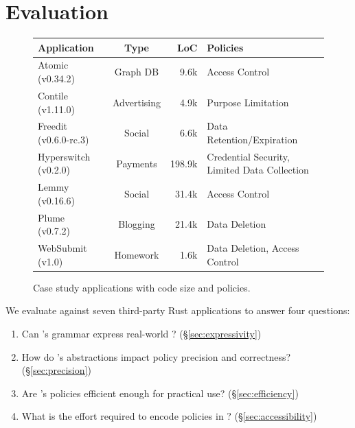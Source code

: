 \chapter{Evaluation}

\begin{figure}
    \centering
    \small
     \begin{tabular}{l|c|r|l}
       \bf Application        & \bf Type    & \bf LoC & \bf Policies   \\
      \hline
       Atomic~\cite{atomic} (v0.34.2)       & Graph DB    & 9.6k   & Access Control                                 \\
       Contile~\cite{contile} (v1.11.0)     & Advertising & 4.9k     & Purpose Limitation                           \\
       Freedit~\cite{freedit} (v0.6.0-rc.3) & Social      & 6.6k     & Data Retention/Expiration                     \\
       Hyperswitch~\cite{hyperswitch} (v0.2.0)   & Payments    & 198.9k     & Credential Security, Limited Data Collection  \\
       Lemmy~\cite{lemmy} (v0.16.6)        & Social      & 31.4k   & Access Control                               \\
       Plume~\cite{plume} (v0.7.2)         & Blogging    & 21.4k   & Data Deletion                                \\
       WebSubmit~\cite{websubmit} (v1.0)       & Homework    & 1.6k    & Data Deletion, Access Control     \\
    \end{tabular}
    \caption{Case study applications with code size and policies.}
    \label{f:apps}
   \end{figure}

We evaluate \syslang{} against seven third-party Rust applications to answer four questions:
%
\begin{enumerate}[nosep]
    \item Can \syslang's grammar express real-world \policies? (\S\ref{sec:expressivity})
    \item How do \syslang's abstractions impact policy precision and correctness?(\S\ref{sec:precision})
    \item Are \syslang's policies efficient enough for practical use? (\S\ref{sec:efficiency})
    \item What is the effort required to encode policies in \syslang? (\S\ref{sec:accessibility})
\end{enumerate}
%

